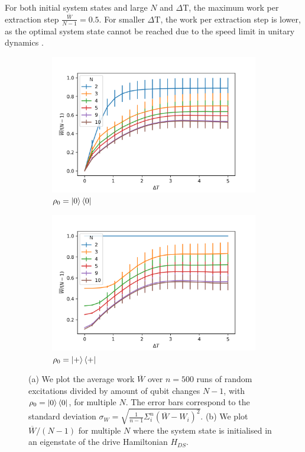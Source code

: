 For both initial system states and large $N$ and $\Delta \mathrm{T}$, the maximum work per extraction step $\frac{\overline{W}}{N-1} = 0.5$.
For smaller $\Delta \mathrm{T}$, the work per extraction step is lower, as the optimal system state cannot be reached due to the speed limit in unitary dynamics \cite{Deffner_2017, PhysRevA.67.052109}.

\begin{figure}[h]
	\centering
	\begin{subfigure}{0.4\textwidth}
		\centering
		\includegraphics[width=\textwidth]{img/dt_0}
		\caption{$\rho_0 = \ket{0}\bra{0}$}
		\label{dt_0}
	\end{subfigure}
	\begin{subfigure}{0.4\textwidth}
	\centering
	\includegraphics[width=\textwidth]{img/dt_eigen}
	\caption{$\rho_0 = \ket{+}\bra{+}$}
	\label{dt_eigen}
	\end{subfigure}
	\caption{(a) We plot the average work $\overline{W}$ over $n = 500$ runs of random excitations divided by amount of qubit changes $N - 1$, with $\rho_0 = \ket{0}\bra{0}$, for multiple $N$. The error bars correspond to the standard deviation $\sigma_{W} = \sqrt{\frac{1}{n-1} \Sigma_i^n (\overline{W} - W_i)^2}$.
	(b) We plot $\overline{W}/(N-1)$ for multiple $N$ where the system state is initialised in an eigenstate of the drive Hamiltonian $H_{DS}$.}
	\label{dt_dep}
\end{figure}